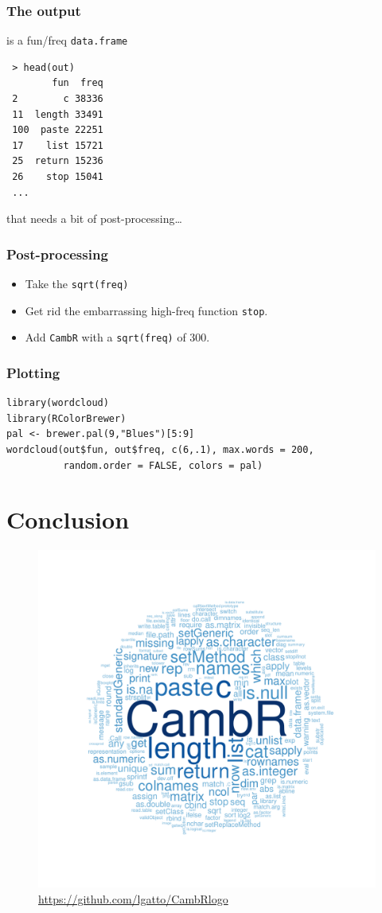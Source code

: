 \documentclass{beamer}
\begin{document}
\begin{frame}[fragile]
\frametitle{The output}
\label{sec-2-4}

is a fun/freq \texttt{data.frame}

\begin{verbatim}
 > head(out)
        fun  freq
 2        c 38336
 11  length 33491
 100  paste 22251
 17    list 15721
 25  return 15236
 26    stop 15041
 ...
\end{verbatim}

that needs a bit of post-processing\ldots{}
\end{frame}
\begin{frame}
\frametitle{Post-processing}
\label{sec-2-5}


\begin{itemize}
\item Take the \texttt{sqrt(freq)}
\item Get rid the embarrassing high-freq function \texttt{stop}.
\item Add \texttt{CambR} with a \texttt{sqrt(freq)} of 300.
\end{itemize}
 
\end{frame}
\begin{frame}[fragile]
\frametitle{Plotting}
\label{sec-2-6}


\begin{verbatim}
library(wordcloud)
library(RColorBrewer)
pal <- brewer.pal(9,"Blues")[5:9]
wordcloud(out$fun, out$freq, c(6,.1), max.words = 200, 
          random.order = FALSE, colors = pal)
\end{verbatim}
\end{frame}
\section{Conclusion}
\label{sec-3}


\begin{figure}[htb]
\centering
\includegraphics[width=.7\linewidth]{./figs/CambR-logo.pdf}
\caption{\label{fig:logo}\url{https://github.com/lgatto/CambRlogo}}
\end{figure}
\end{document}
